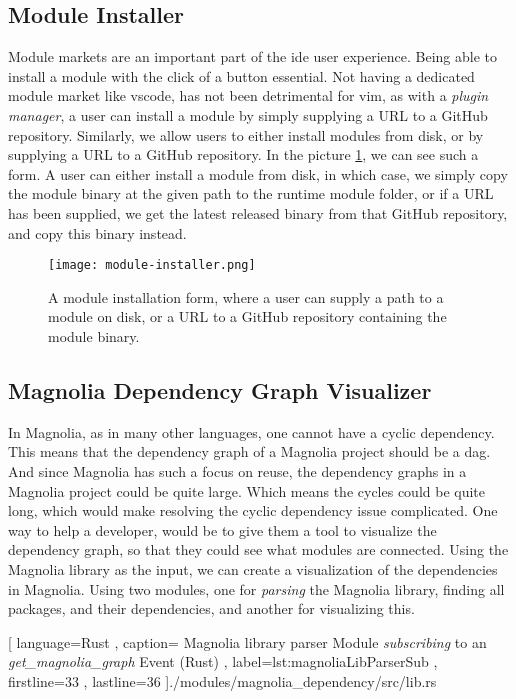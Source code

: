 \subsection{Module Installer}

Module markets are an important part of the \gls{ide} user experience. Being
able to install a module with the click of a button essential. Not having a
dedicated module market like \gls{vscode}, has not been detrimental for
\gls{vim}, as with a \textit{plugin manager}, a user can install a module by
simply supplying a URL to a GitHub repository. Similarly, we allow users to
either install modules from disk, or by supplying a URL to a GitHub repository.
In the picture \ref{pic:moduleInstaller}, we can see such a form. A user can
either install a module from disk, in which case, we simply copy the module
binary at the given path to the runtime module folder, or if a URL has been
supplied, we get the latest released binary from that GitHub repository, and
copy this binary instead.

\begin{figure}
  \centering
  \texttt{[image: module-installer.png]}
  \caption{
    A module installation form, where a user can supply a path to a module on
    disk, or a URL to a GitHub repository containing the module binary.
  }
  \label{pic:moduleInstaller}
\end{figure}

\subsection{Magnolia Dependency Graph Visualizer}

In Magnolia, as in many other languages, one cannot have a cyclic dependency.
This means that the dependency graph of a Magnolia project should be a
\gls{dag}. And since Magnolia has such a focus on reuse, the dependency graphs
in a Magnolia project could be quite large. Which means the cycles could be
quite long, which would make resolving the cyclic dependency issue complicated.
One way to help a developer, would be to give them a tool to visualize the
dependency graph, so that they could see what modules are connected. Using the
Magnolia library as the input, we can create a visualization of the dependencies
in Magnolia. Using two modules, one for \textit{parsing} the Magnolia library,
finding all packages, and their dependencies, and another for visualizing
this.

\begin{center}
  
    [ language=Rust
    , caption={
      Magnolia library parser Module \textit{subscribing} to an
      \textit{get\_magnolia\_graph } Event (Rust)
    }
    , label=lst:magnoliaLibParserSub
    , firstline=33
    , lastline=36
    ]{./modules/magnolia\_dependency/src/lib.rs}
\end{center}


